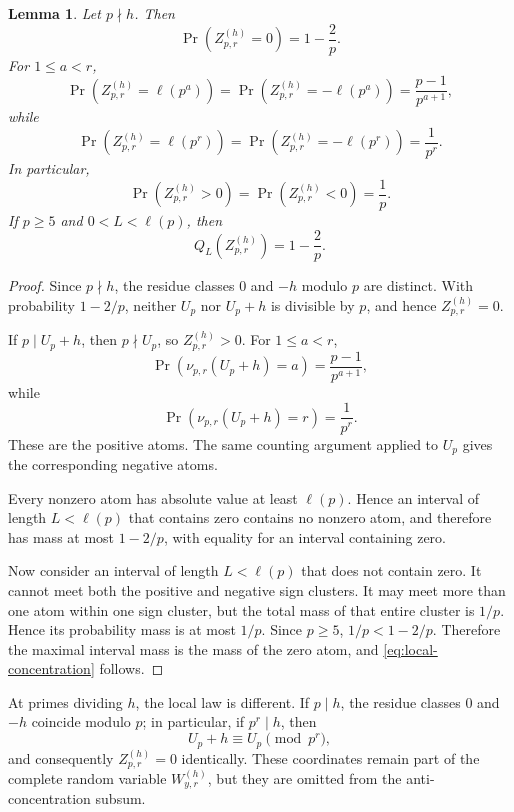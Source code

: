 \documentclass[11pt,reqno]{amsart}
\numberwithin{equation}{section}
\theoremstyle{plain}
\newtheorem{lemma}[theorem]{Lemma}
\theoremstyle{definition}
\theoremstyle{remark}
\begin{document}
\begin{lemma}\label{lem:local-law}
Let $p\nmid h$. Then
\[
\Pr\!\left(Z^{(h)}_{p,r}=0\right)=1-\frac2p.
\]
For $1\le a<r$,
\[
\Pr\!\left(Z^{(h)}_{p,r}=\ell(p^a)\right)
=
\Pr\!\left(Z^{(h)}_{p,r}=-\ell(p^a)\right)
=
\frac{p-1}{p^{a+1}},
\]
while
\[
\Pr\!\left(Z^{(h)}_{p,r}=\ell(p^r)\right)
=
\Pr\!\left(Z^{(h)}_{p,r}=-\ell(p^r)\right)
=
\frac1{p^r}.
\]
In particular,
\[
\Pr\!\left(Z^{(h)}_{p,r}>0\right)
=
\Pr\!\left(Z^{(h)}_{p,r}<0\right)
=
\frac1p.
\]
If $p\ge5$ and $0<L<\ell(p)$, then
\begin{equation}\label{eq:local-concentration}
Q_L\!\left(Z^{(h)}_{p,r}\right)=1-\frac2p.
\end{equation}
\end{lemma}
\begin{proof}
Since $p\nmid h$, the residue classes $0$ and $-h$ modulo $p$ are distinct. With probability $1-2/p$, neither $U_p$ nor $U_p+h$ is divisible by $p$, and hence $Z^{(h)}_{p,r}=0$.

If $p\mid U_p+h$, then $p\nmid U_p$, so
$Z^{(h)}_{p,r}>0$. For $1\le a<r$,
\[
\Pr\!\left(\nu_{p,r}(U_p+h)=a\right)
=
\frac{p-1}{p^{a+1}},
\]
while
\[
\Pr\!\left(\nu_{p,r}(U_p+h)=r\right)
=
\frac1{p^r}.
\]
These are the positive atoms. The same counting argument applied to
$U_p$ gives the corresponding negative atoms.

Every nonzero atom has absolute value at least $\ell(p)$. Hence an interval of length $L<\ell(p)$ that contains zero contains no nonzero atom, and therefore has mass at most $1-2/p$, with equality for an interval containing zero.

Now consider an interval of length $L<\ell(p)$ that does not contain zero. It cannot meet both the positive and negative sign clusters. It may meet more than one atom within one sign cluster, but the total mass of that entire cluster is $1/p$. Hence its probability mass is at most $1/p$. Since $p\ge5$, $1/p<1-2/p$. Therefore the maximal interval mass is the mass of the zero atom, and \eqref{eq:local-concentration} follows.
\end{proof}

At primes dividing $h$, the local law is different. If $p\mid h$, the residue classes $0$ and $-h$ coincide modulo $p$; in particular, if $p^r\mid h$, then
\[
U_p+h\equiv U_p\pmod{p^r},
\]
and consequently $Z^{(h)}_{p,r}=0$ identically. These coordinates remain part of the complete random variable $W^{(h)}_{y,r}$, but they are omitted from the anti-concentration subsum.
\end{document}
